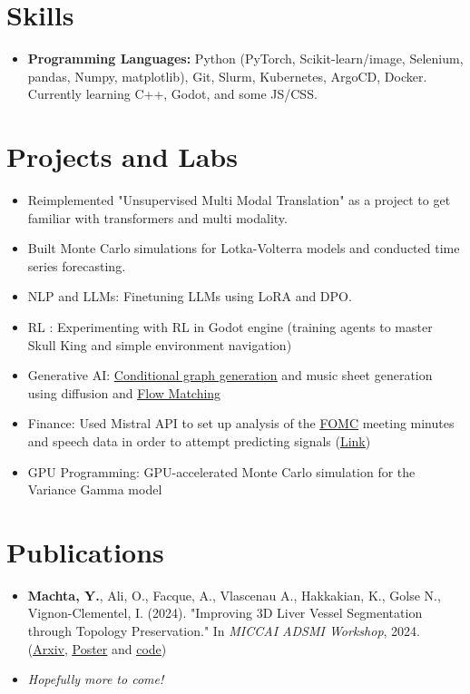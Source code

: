 \documentclass[letterpaper,11pt,twocolumn]{article}
\newcommand{\resumeItem}[1]{\item \small{#1}}
\begin{document}
\section{Skills}
\begin{itemize}[leftmargin=*]
	\item \textbf{Programming Languages:} Python (PyTorch, Scikit-learn/image, Selenium, pandas, Numpy, matplotlib), Git, Slurm, Kubernetes, ArgoCD, Docker. Currently learning C++, Godot, and some JS/CSS.
\end{itemize}

\section{Projects and Labs}
\begin{itemize}[leftmargin=*]
	\resumeItem{Reimplemented "Unsupervised Multi Modal Translation" as a project to get familiar with transformers and multi modality.}
	\resumeItem{Built Monte Carlo simulations for Lotka-Volterra models and conducted time series forecasting.}
	\resumeItem{NLP and LLMs: Finetuning LLMs using LoRA and DPO.}
	\resumeItem{RL : Experimenting with RL in Godot engine (training agents to master Skull King and simple environment navigation)}
	\resumeItem{Generative AI: \underline{\href{https://github.com/MachtaYassine/GGSP-ALTEGRAD/tree/main}{Conditional graph generation}} and music sheet generation using diffusion and \underline{\href{https://colab.research.google.com/drive/1HT1E62hvaACGgLNt3xu5m51AO4m_fTxO}{Flow Matching}}}
	\resumeItem{Finance: Used Mistral API to set up analysis of the \href{https://www.federalreserve.gov/monetarypolicy/fomccalendars.htm}{\underline{FOMC}} meeting minutes and speech data in order to attempt predicting signals (\underline{\href{https://colab.research.google.com/drive/1qGfLkEFJ_ta2YnJD77EUxmsFi99Svo5X?usp=sharing}{Link}})}
	\resumeItem{GPU Programming: GPU-accelerated Monte Carlo simulation for the Variance Gamma model}
\end{itemize}

\section{Publications}
\begin{itemize}[leftmargin=*]
	\resumeItem{\textbf{Machta, Y.}, Ali, O., Facque, A., Vlascenau A., Hakkakian, K., Golse N., Vignon-Clementel, I. (2024). "Improving 3D Liver Vessel Segmentation through Topology Preservation." In \textit{MICCAI ADSMI Workshop}, 2024. (\href{https://arxiv.org/abs/2411.15778}{\underline{Arxiv}}, \href{https://MachtaYassine.github.io/Papers/2024_ADSMI_poster.pdf}{\underline{Poster}} and \underline{\href{https://gitlab.inria.fr/simbiotx/LiverVesselSeg}{code}})}
	\resumeItem{\textit{Hopefully more to come!}}
\end{itemize}
\end{document}

